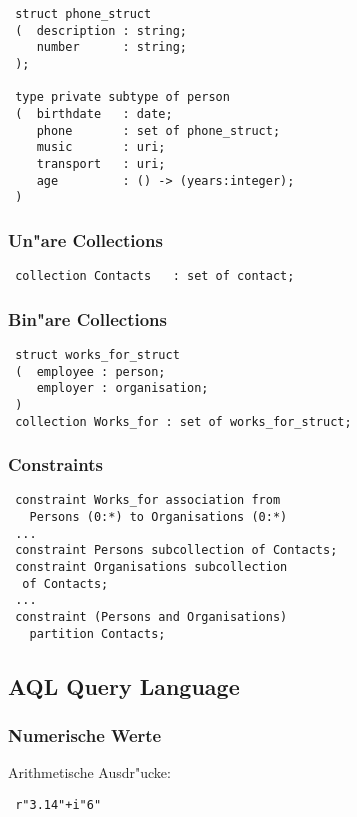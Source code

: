 \documentclass[german, 10pt, a4paper, twocolumn]{scrartcl}
\theoremstyle{definition}
\theoremstyle{remark}
\theoremstyle{example}
\begin{document}
\begin{verbatim}
 struct phone_struct
 (  description : string;
    number      : string;
 );

 type private subtype of person
 (  birthdate   : date;
    phone       : set of phone_struct;
    music       : uri;
    transport   : uri;
    age         : () -> (years:integer);
 )
\end{verbatim}

\subsubsection{Un"are Collections}

\begin{verbatim}
 collection Contacts   : set of contact;
\end{verbatim}

\subsubsection{Bin"are Collections}

\begin{verbatim}
 struct works_for_struct
 (  employee : person;
    employer : organisation;
 )
 collection Works_for : set of works_for_struct;
\end{verbatim}

\subsubsection{Constraints}

\begin{verbatim}
 constraint Works_for association from
   Persons (0:*) to Organisations (0:*)
 ...
 constraint Persons subcollection of Contacts;
 constraint Organisations subcollection
  of Contacts;
 ...
 constraint (Persons and Organisations)
   partition Contacts;
\end{verbatim}

\subsection{AQL Query Language}

\subsubsection{Numerische Werte}

Arithmetische Ausdr"ucke:
\begin{verbatim}
 r"3.14"+i"6"
\end{verbatim}
\end{document}

